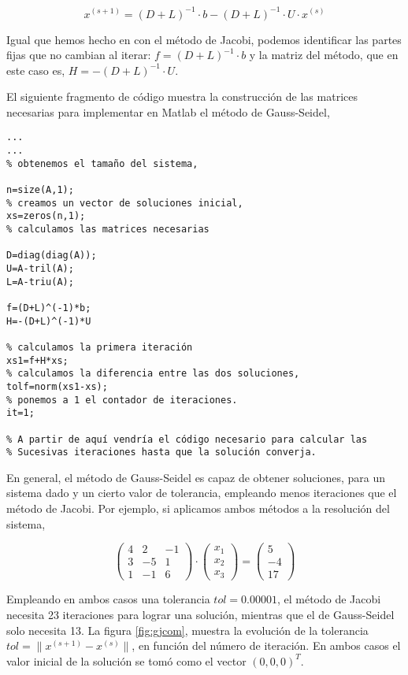 \begin{equation*}
x^{(s+1)}= (D+L)^{-1}\cdot b-(D+L)^{-1}\cdot U\cdot x^{(s)}
\end{equation*}

Igual que hemos hecho en con el método de Jacobi, podemos identificar las partes fijas que no cambian al iterar: $f=(D+L)^{-1}\cdot b$ y la matriz del método, que en este caso es, $H=-(D+L)^{-1}\cdot U$.

El siguiente fragmento de código muestra la construcción de las matrices necesarias para implementar en Matlab el método de Gauss-Seidel,
\begin{lstlisting}
...
...
% obtenemos el tamaño del sistema,

n=size(A,1);
% creamos un vector de soluciones inicial,
xs=zeros(n,1);
% calculamos las matrices necesarias

D=diag(diag(A));
U=A-tril(A);
L=A-triu(A);

f=(D+L)^(-1)*b;
H=-(D+L)^(-1)*U

% calculamos la primera iteración
xs1=f+H*xs;
% calculamos la diferencia entre las dos soluciones,
tolf=norm(xs1-xs);
% ponemos a 1 el contador de iteraciones.
it=1;

% A partir de aquí vendría el código necesario para calcular las 
% Sucesivas iteraciones hasta que la solución converja.
\end{lstlisting}

En general, el método de Gauss-Seidel es capaz de obtener soluciones, para un sistema dado y un cierto valor de tolerancia, empleando menos iteraciones que el método de Jacobi. Por ejemplo, si aplicamos ambos métodos a la resolución del sistema,

\begin{equation*}
\begin{pmatrix}
4& 2& -1\\
3& -5& 1\\
1& -1& 6
\end{pmatrix}\cdot \begin{pmatrix}
x_1\\
x_2\\
x_3
\end{pmatrix}=\begin{pmatrix}
5\\
-4\\
17
\end{pmatrix}
\end{equation*}

Empleando en ambos casos una tolerancia $tol=0.0000	1$, el método de Jacobi necesita 23 iteraciones para lograr una solución, mientras que el de Gauss-Seidel solo necesita 13. La figura \ref{fig:gjcom}, muestra la evolución de la tolerancia $tol=\lVert x^{(s+1)}-x^{(s)} \rVert$, en función del número de iteración. En ambos casos el valor inicial de la solución se tomó como el vector $(0,0,0)^T$.

